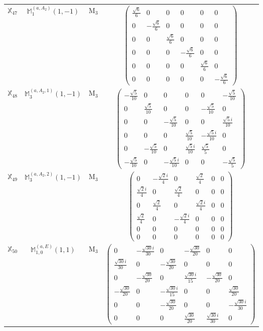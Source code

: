 \documentclass[fleqn,10pt,landscape]{article}
\begin{document}
\begin{itemize}
\begin{center}
\begin{longtable}{c|c|c|c}
$ \mathbb{X}_{47} $ & $\mathbb{M}_{1}^{(a,A_{2})}(1,-1)$ & M$_{3}$ & $\begin{pmatrix} \frac{\sqrt{6}}{6} & 0 & 0 & 0 & 0 & 0 \\ 0 & - \frac{\sqrt{6}}{6} & 0 & 0 & 0 & 0 \\ 0 & 0 & \frac{\sqrt{6}}{6} & 0 & 0 & 0 \\ 0 & 0 & 0 & - \frac{\sqrt{6}}{6} & 0 & 0 \\ 0 & 0 & 0 & 0 & \frac{\sqrt{6}}{6} & 0 \\ 0 & 0 & 0 & 0 & 0 & - \frac{\sqrt{6}}{6} \end{pmatrix}$ \\
$ \mathbb{X}_{48} $ & $\mathbb{M}_{3}^{(a,A_{2},1)}(1,-1)$ & M$_{3}$ & $\begin{pmatrix} - \frac{\sqrt{5}}{10} & 0 & 0 & 0 & 0 & - \frac{\sqrt{5}}{10} \\ 0 & \frac{\sqrt{5}}{10} & 0 & 0 & - \frac{\sqrt{5}}{10} & 0 \\ 0 & 0 & - \frac{\sqrt{5}}{10} & 0 & 0 & \frac{\sqrt{5} i}{10} \\ 0 & 0 & 0 & \frac{\sqrt{5}}{10} & - \frac{\sqrt{5} i}{10} & 0 \\ 0 & - \frac{\sqrt{5}}{10} & 0 & \frac{\sqrt{5} i}{10} & \frac{\sqrt{5}}{5} & 0 \\ - \frac{\sqrt{5}}{10} & 0 & - \frac{\sqrt{5} i}{10} & 0 & 0 & - \frac{\sqrt{5}}{5} \end{pmatrix}$ \\
$ \mathbb{X}_{49} $ & $\mathbb{M}_{3}^{(a,A_{2},2)}(1,-1)$ & M$_{3}$ & $\begin{pmatrix} 0 & - \frac{\sqrt{2} i}{4} & 0 & \frac{\sqrt{2}}{4} & 0 & 0 \\ \frac{\sqrt{2} i}{4} & 0 & \frac{\sqrt{2}}{4} & 0 & 0 & 0 \\ 0 & \frac{\sqrt{2}}{4} & 0 & \frac{\sqrt{2} i}{4} & 0 & 0 \\ \frac{\sqrt{2}}{4} & 0 & - \frac{\sqrt{2} i}{4} & 0 & 0 & 0 \\ 0 & 0 & 0 & 0 & 0 & 0 \\ 0 & 0 & 0 & 0 & 0 & 0 \end{pmatrix}$ \\
$ \mathbb{X}_{50} $ & $\mathbb{M}_{1,0}^{(a,E)}(1,1)$ & M$_{3}$ & $\begin{pmatrix} 0 & - \frac{\sqrt{30} i}{30} & 0 & - \frac{\sqrt{30}}{20} & 0 & 0 \\ \frac{\sqrt{30} i}{30} & 0 & - \frac{\sqrt{30}}{20} & 0 & 0 & 0 \\ 0 & - \frac{\sqrt{30}}{20} & 0 & \frac{\sqrt{30} i}{15} & - \frac{\sqrt{30}}{20} & 0 \\ - \frac{\sqrt{30}}{20} & 0 & - \frac{\sqrt{30} i}{15} & 0 & 0 & \frac{\sqrt{30}}{20} \\ 0 & 0 & - \frac{\sqrt{30}}{20} & 0 & 0 & - \frac{\sqrt{30} i}{30} \\ 0 & 0 & 0 & \frac{\sqrt{30}}{20} & \frac{\sqrt{30} i}{30} & 0 \end{pmatrix}$ \\

\end{longtable}
\end{center}
\end{itemize}
\end{document}
